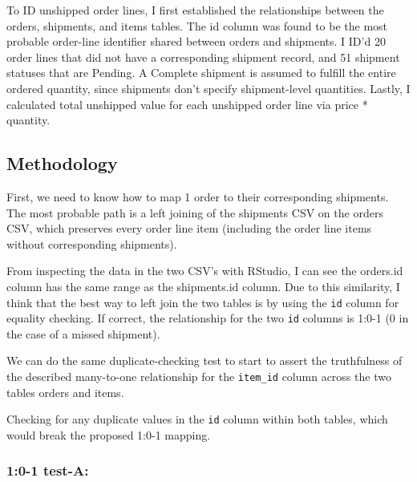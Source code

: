 \documentclass[
]{article}
\newenvironment{Shaded}{\begin{snugshade}}{\end{snugshade}}
\newcommand{\CommentTok}[1]{\textcolor[rgb]{0.56,0.35,0.01}{\textit{#1}}}
\newcommand{\FunctionTok}[1]{\textcolor[rgb]{0.13,0.29,0.53}{\textbf{#1}}}
\newcommand{\NormalTok}[1]{#1}
\newcommand{\SpecialCharTok}[1]{\textcolor[rgb]{0.81,0.36,0.00}{\textbf{#1}}}
\begin{document}
To ID unshipped order lines, I first established the relationships
between the orders, shipments, and items tables. The id column was found
to be the most probable order-line identifier shared between orders and
shipments. I ID'd 20 order lines that did not have a corresponding
shipment record, and 51 shipment statuses that are Pending. A Complete
shipment is assumed to fulfill the entire ordered quantity, since
shipments don't specify shipment-level quantities. Lastly, I calculated
total unshipped value for each unshipped order line via price *
quantity.

\subsection{Methodology}\label{method}

First, we need to know how to map 1 order to their corresponding
shipments. The most probable path is a left joining of the shipments CSV
on the orders CSV, which preserves every order line item (including the
order line items without corresponding shipments).

From inspecting the data in the two CSV's with RStudio, I can see the
orders.id column has the same range as the shipments.id column. Due to
this similarity, I think that the best way to left join the two tables
is by using the \texttt{id} column for equality checking. If correct,
the relationship for the two \texttt{id} columns is 1:0-1 (0 in the case
of a missed shipment).

We can do the same duplicate-checking test to start to assert the
truthfulness of the described many-to-one relationship for the
\texttt{item\_id} column across the two tables orders and items.

Checking for any duplicate values in the \texttt{id} column within both
tables, which would break the proposed 1:0-1 mapping.

\subsubsection{1:0-1 test-A:}\label{test-a}

\begin{Shaded}
\end{Shaded}
\end{document}
